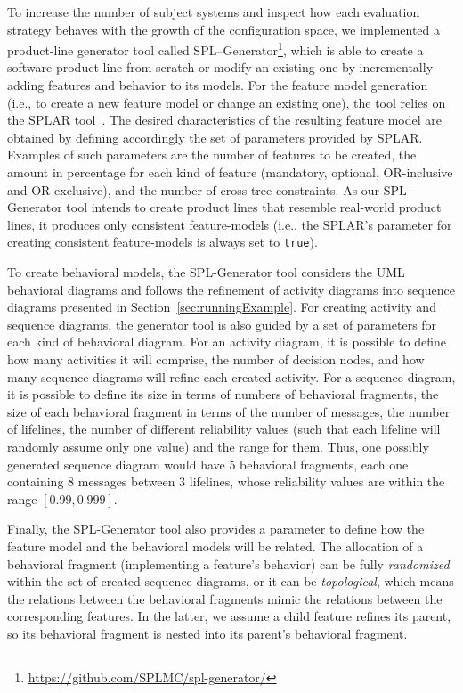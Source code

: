 To increase the number of subject systems and
inspect how each evaluation strategy behaves with the growth of the
configuration space, we implemented a product-line generator tool called
SPL--Generator\footnote{\url{https://github.com/SPLMC/spl-generator/}}, which is
able to create a software product line from scratch or modify an existing one by
incrementally adding features and behavior to its models. For the feature model
generation (i.e., to create a new feature model or change an existing one), the
tool relies on the SPLAR tool~\cite{mendonca:2009}. The desired characteristics
of the resulting feature model are obtained by defining accordingly the set of
parameters provided by SPLAR. Examples of such parameters are the number of
features to be created, the amount in percentage for each kind of feature
(mandatory, optional, OR-inclusive and OR-exclusive), and the number of
cross-tree constraints. As our SPL-Generator tool intends to create product
lines that resemble real-world product lines, it produces only consistent
feature-models (i.e., the SPLAR's parameter for creating consistent
feature-models is always set to \texttt{true}).

To create behavioral models, the SPL-Generator tool considers the UML behavioral
diagrams and follows the refinement of activity diagrams into sequence diagrams
presented in Section~\ref{sec:runningExample}. For creating activity  and
sequence diagrams, the generator tool is also guided by a set of parameters for
each kind of behavioral diagram.  For an activity diagram, it is possible to
define how many activities it will comprise, the number of decision nodes, and
how many sequence diagrams will refine each created activity. For a sequence
diagram, it is possible to define its size in terms of numbers of behavioral
fragments, the size of each behavioral fragment in terms of the number of
messages, the number of lifelines, the number of different reliability values
(such that each lifeline will  randomly assume only one value) and the range for
them. Thus, one possibly generated  sequence diagram  would have 5 behavioral
fragments, each one containing 8 messages between 3 lifelines, whose reliability
values are within the range $[0.99, 0.999]$. 

Finally, the SPL-Generator tool also provides a parameter to define how the
feature model and the behavioral models will be related.  The allocation of a
behavioral fragment (implementing a feature's behavior) can be fully
\emph{randomized} within the set of created sequence diagrams, or it can be
\emph{topological}, which means the relations between the behavioral fragments
mimic the relations between the corresponding features.  In the latter, we
assume a child feature refines its parent, so its behavioral fragment is nested
into its parent's behavioral fragment.

